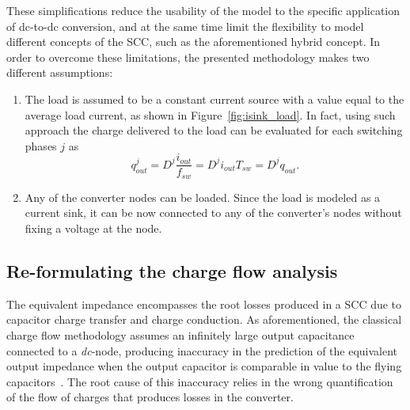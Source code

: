 These simplifications reduce the usability of the model to the specific application of dc-to-dc conversion, and at the same time limit the flexibility to model different concepts of the SCC, such as the aforementioned hybrid concept. In order to overcome these limitations, the presented methodology makes two different assumptions:
\begin{enumerate}
  \item The load is assumed to be a constant current source with a value equal to the average load current, as shown in Figure~\ref{fig:isink_load}. In fact, using such approach the charge delivered to the load can be evaluated for each switching phases $j$ as
      \begin{equation}
        q_{out}^j = D^j \frac{i_{out}}{f_{sw}} = D^j i_{out}{T_{sw}}  = D^j q_{out}.
      \label{eq:q_out}
      \end{equation}

  \item Any of the converter nodes can be loaded. Since the load is modeled as a current sink, it can be now connected to any of the converter's nodes without fixing a voltage at the node.

\end{enumerate}


\subsection{Re-formulating the charge flow analysis}

The equivalent impedance encompasses the root losses produced in a SCC due to capacitor charge transfer and charge conduction. As aforementioned, the classical charge flow methodology assumes an infinitely large output capacitance connected to a \emph{dc}-node, producing inaccuracy in the prediction of the equivalent output impedance when the output capacitor is comparable in value to the flying capacitors~\cite{2013Breussegem:c_out}. The root cause of this inaccuracy relies in the wrong quantification of the flow of  charges that produces losses in the converter.\\

